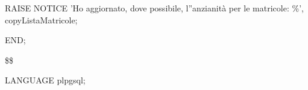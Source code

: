 \begin{flushleft}
\begin{description}
\begin{description}
                        \vspace{0.5cm}
                            
                        \item RAISE NOTICE 'Ho aggiornato, dove possibile, l''anzianità per le matricole: \%', copyListaMatricole;
                    \end{description}
                    \item END;
                    \item \$\$
                    \item LANGUAGE plpgsql;
                \end{description}
            \end{flushleft}
        \normalfont

\newpage

